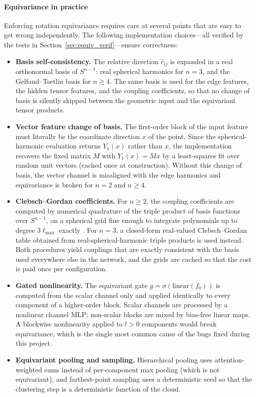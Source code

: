 \documentclass[a4paper,11pt]{article}
\begin{document}
\paragraph{Equivariance in practice}
Enforcing rotation equivariance requires care at several points that are easy to get wrong independently.
The following implementation choices---all verified by the tests in Section~\ref{sec:equiv_verif}---ensure correctness:
\begin{itemize}
    \item \textbf{Basis self-consistency.}
    The relative direction $\hat r_{ij}$ is expanded in a real orthonormal basis of $S^{n-1}$: real spherical harmonics for $n=3$, and the Gelfand--Tsetlin basis \cite{cgsuN2011} for $n\ge 4$.
    The same basis is used for the edge features, the hidden tensor features, and the coupling coefficients, so that no change of basis is silently skipped between the geometric input and the equivariant tensor products.
    \item \textbf{Vector feature change of basis.}
    The first-order block of the input feature must literally be the coordinate direction $x$ of the point.
    Since the spherical-harmonic evaluation returns $Y_1(x)$ rather than $x$, the implementation recovers the fixed matrix $M$ with $Y_1(x)=Mx$ by a least-squares fit over random unit vectors (cached once at construction).
    Without this change of basis, the vector channel is misaligned with the edge harmonics and equivariance is broken for $n=2$ and $n\ge4$.
    \item \textbf{Clebsch--Gordan coefficients.}
    For $n\ge 2$, the coupling coefficients are computed by numerical quadrature of the triple product of basis functions over $S^{n-1}$, on a spherical grid fine enough to integrate polynomials up to degree $3\ell_{\max}$ exactly \cite{cgcompact2017}.
    For $n=3$, a closed-form real-valued Clebsch--Gordan table obtained from real-spherical-harmonic triple products is used instead.
    Both procedures yield couplings that are exactly consistent with the basis used everywhere else in the network, and the grids are cached so that the cost is paid once per configuration.
    \item \textbf{Gated nonlinearity.}
    The equivariant gate $g=\sigma(\mathrm{linear}(f_0))$ is computed from the scalar channel only and applied identically to every component of a higher-order block.
    Scalar channels are processed by a nonlinear channel MLP; non-scalar blocks are mixed by bias-free linear maps.
    A blockwise nonlinearity applied to $l>0$ components would break equivariance, which is the single most common cause of the bugs fixed during this project.
    \item \textbf{Equivariant pooling and sampling.}
    Hierarchical pooling uses attention-weighted sums instead of per-component max pooling (which is not equivariant), and farthest-point sampling uses a deterministic seed so that the clustering step is a deterministic function of the cloud.
\end{itemize}
\end{document}
